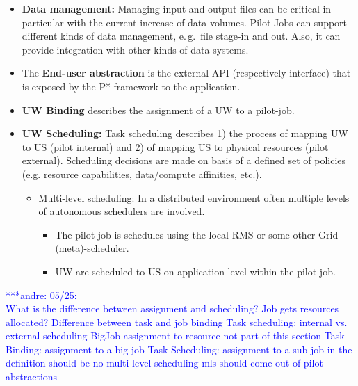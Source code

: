 \documentclass[]{article}
\newcommand{\alnote}[1]{ {\textcolor{blue} { ***andre: #1 }}}
\newcommand{\alnote}[1]{}
\begin{document}
\begin{itemize}
	\item \textbf{Data management:} Managing input and output files can be 
	critical in particular with the current increase of data volumes. Pilot-Jobs 
	can support different kinds of data management, e.\,g.\ file stage-in and 
	out. Also, it can provide integration with other kinds of data systems.
	\item The \textbf{End-user abstraction} is the external API (respectively 
	interface) that is exposed by the P*-framework to the application.
	\item \textbf{UW Binding} describes the assignment of a UW to a pilot-job.
	\item \textbf{UW Scheduling:} Task scheduling describes 1) the process of  
	mapping UW to US (pilot internal) and 2) of mapping US to physical 
	resources (pilot external). Scheduling decisions are made on basis of a 
	defined set of policies (e.g. resource capabilities, data/compute 
	affinities, etc.).
	\begin{itemize}
	 			\item Multi-level scheduling: In a distributed environment often multiple levels of autonomous schedulers are involved. 
	 			\begin{itemize}	 			  
	 			   \item The pilot job is schedules using the local RMS or some 
	 			   other Grid (meta)-scheduler.
	 			   \item UW are scheduled to US on application-level within the 
	 			   pilot-job.
	 			\end{itemize}
	\end{itemize}
\end{itemize}
	\alnote{05/25:\\
	What is the difference between assignment and scheduling? Job gets
	resources allocated? 
	Difference between task and job binding
	Task scheduling: internal vs. external scheduling
	BigJob assignment to resource not part of this section
	Task Binding: assignment to a big-job
	Task Scheduling: assignment to a sub-job	
	in the definition should be no multi-level scheduling
    mls should come out of pilot abstractions
}
	
\end{document}
